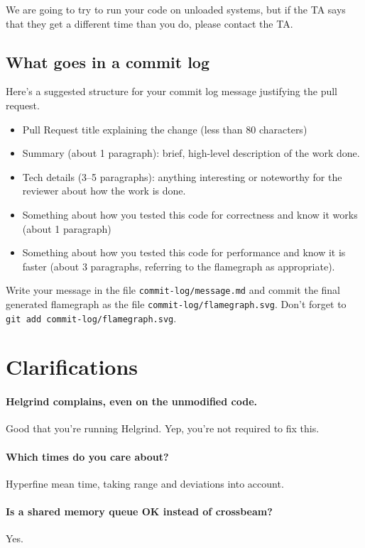 We are going to try to run your code on unloaded systems, but if the TA says that they get a different time than you do,
please contact the TA.

\subsection*{What goes in a commit log}
Here's a suggested structure for your commit log message justifying the pull request.
\begin{itemize}
\item Pull Request title explaining the change (less than 80 characters)
\item Summary (about 1 paragraph): brief, high-level description of the work done.
\item Tech details (3--5 paragraphs): anything interesting or noteworthy for the reviewer about how the work is done. 
\item Something about how you tested this code for correctness and know it works (about 1 paragraph)
\item Something about how you tested this code for performance and know it is faster (about 3 paragraphs, referring to the flamegraph as appropriate).
\end{itemize}
Write your message in the file {\tt commit-log/message.md} and commit the final generated flamegraph as the file {\tt commit-log/flamegraph.svg}. Don't forget to {\tt git add commit-log/flamegraph.svg}.

\section*{Clarifications}

\paragraph{Helgrind complains, even on the unmodified code.} Good that you're running Helgrind. Yep, you're not required to fix this.

\paragraph{Which times do you care about?} Hyperfine mean time, taking range and deviations into account.

\paragraph{Is a shared memory queue OK instead of crossbeam?} Yes.

